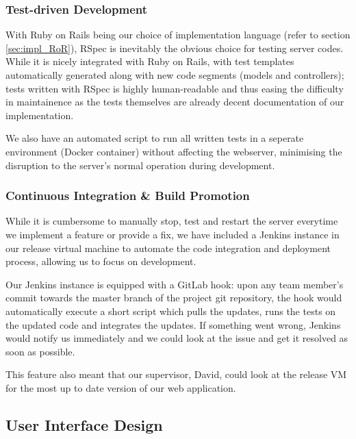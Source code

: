 \documentclass[a4paper, titlepage]{article}
\begin{document}
\subsubsection{Test-driven Development} \label{sec:projman_tdd}
With Ruby on Rails being our choice of implementation language (refer to section \ref{sec:impl_RoR}),
RSpec is inevitably the obvious choice for testing server codes.
While it is nicely integrated with Ruby on Rails, with test templates automatically
generated along with new code segments (models and controllers);
tests written with RSpec is highly human-readable and thus
easing the difficulty in maintainence as the tests themselves are already
decent documentation of our implementation.

We also have an automated script to run all written tests in a seperate
environment (Docker container) without affecting the webserver, minimising
the disruption to the server's normal operation during development.



\subsubsection{Continuous Integration \& Build Promotion}

While it is cumbersome to manually stop, test and restart the server
everytime we implement a feature or provide a fix, we have
included a Jenkins instance in our release virtual machine to automate
the code integration and deployment process, allowing us to focus on
development.

Our Jenkins instance is equipped with a GitLab hook: upon any team member's
commit towards the master branch of the project git repository, the hook would
automatically execute a short script which pulls the updates, runs the tests
on the updated code and integrates the updates. If something went wrong,
Jenkins would notify us immediately and we could look at the issue and get
it resolved as soon as possible.

This feature also meant that our supervisor, David, could look at the release VM 
for the most up to date version of our web application. 

\newpage
\subsection{User Interface Design}
\end{document}
